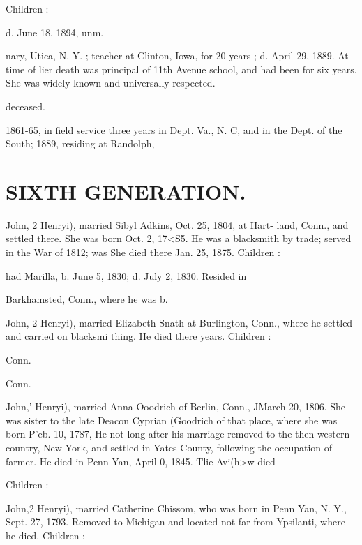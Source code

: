\documentclass{book}
\begin{document}
Children : 


d. June 18, 1894, unm. 


nary, Utica, N. Y. ; teacher at Clinton, Iowa, for 20 years ; 
d. April 29, 1889. At time of lier death was principal of 
11th Avenue school, and had been for six years. She was 
widely known and universally respected. 

deceased. 

1861-65, in field service three years in Dept. Va., N. C, 
and in the Dept. of the South; 1889, residing at Randolph, 




\section{SIXTH GENERATION.}


John, 2 Henryi), married Sibyl Adkins, Oct. 25, 1804, at Hart- 
land, Conn., and settled there. She was born Oct. 2, 17<S5. He 
was a blacksmith by trade; served in the War of 1812; was 
She died there Jan. 25, 1875. Children : 


had Marilla, b. June 5, 1830; d. July 2, 1830. Resided in 

Barkhamsted, Conn., where he was b. 

John, 2 Henryi), married Elizabeth Snath at Burlington, Conn., 
where he settled and carried on blacksmi thing. He died there 
years. Children : 




Conn. 

Conn. 

John,' Henryi), married Anna Ooodrich of Berlin, Conn., JMarch 
20, 1806. She was sister to the late Deacon Cyprian (Goodrich 
of that place, where she was born P'eb. 10, 1787, He not long 
after his marriage removed to the then western country, New 
York, and settled in Yates County, following the occupation of 
farmer. He died in Penn Yan, April 0, 1845. Tlie Avi(h>w died 

Children : 











John,2 Henryi), married Catherine Chissom, who was born in 
Penn Yan, N. Y., Sept. 27, 1793. Removed to Michigan and 
located not far from Ypsilanti, where he died. Chiklren : 
\end{document}
